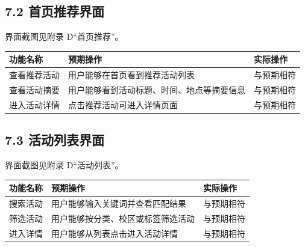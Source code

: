 \subsection{7.2
首页推荐界面}\label{ux9996ux9875ux63a8ux8350ux754cux9762}

界面截图见附录 D``首页推荐''。

{\def\LTcaptype{none} %
\begin{longtable}[]{@{}|
  >{\raggedright\arraybackslash}p{}|
  >{\raggedright\arraybackslash}p{}|
  >{\raggedright\arraybackslash}p{}|@{}}
\hline
\rowcolor{gray!12}
\begin{minipage}[b]{\linewidth}\raggedright
\bfseries 功能名称
\end{minipage} & \begin{minipage}[b]{\linewidth}\raggedright
\bfseries 预期操作
\end{minipage} & \begin{minipage}[b]{\linewidth}\raggedright
\bfseries 实际操作
\end{minipage} \\
\hline
\endhead
\hline
\endlastfoot
查看推荐活动 & 用户能够在首页看到推荐活动列表 & 与预期相符 \\
\hline
查看活动摘要 & 用户能够看到活动标题、时间、地点等摘要信息 &
与预期相符 \\
\hline
进入活动详情 & 点击推荐活动可进入详情页面 & 与预期相符 \\
\hline
\end{longtable}
}

\subsection{7.3
活动列表界面}\label{ux6d3bux52a8ux5217ux8868ux754cux9762}

界面截图见附录 D``活动列表''。

{\def\LTcaptype{none} %
\begin{longtable}[]{@{}|l|l|l|@{}}
\hline
\rowcolor{gray!12}
功能名称 & 预期操作 & 实际操作 \\
\hline
\endhead
\hline
\endlastfoot
搜索活动 & 用户能够输入关键词并查看匹配结果 & 与预期相符 \\
\hline
筛选活动 & 用户能够按分类、校区或标签筛选活动 & 与预期相符 \\
\hline
进入详情 & 用户能够从列表点击进入活动详情 & 与预期相符 \\
\hline
\end{longtable}
}

